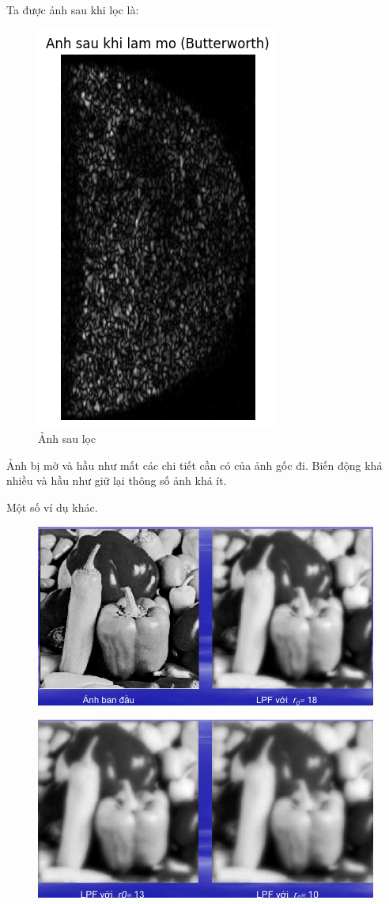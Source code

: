 \documentclass[12pt,a4paper]{report}
\numberwithin{equation}{section}
\theoremstyle{definition} %
\begin{document}
Ta được ảnh sau khi lọc là:

\begin{figure}[H]
\centering
\includegraphics[width=0.35\linewidth]{img/butterworthLowpassFilter.png}
\caption{Ảnh sau lọc}
\end{figure}
Ảnh bị mờ và hầu như mất các chi tiết cần có của ảnh gốc đi. Biến động khá nhiều và hầu như  giữ lại thông số ảnh khá ít. 

Một số ví dụ khác.
\begin{figure}[H]
\centering
\includegraphics[width=0.88\linewidth]{img/BLPF2.png}
\caption{}
\end{figure}

\begin{figure}[H]
\centering
\includegraphics[width=0.88\linewidth]{img/BLPF1.png}
\caption{}
\end{figure}
\end{document}
